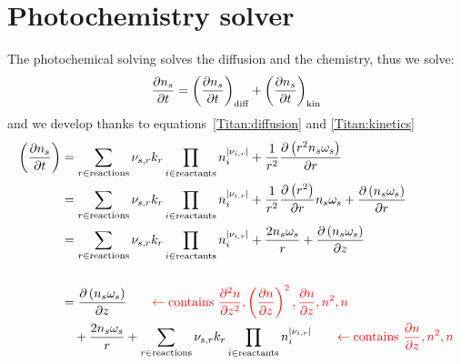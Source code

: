 \section{Photochemistry solver}

The photochemical solving solves the diffusion and the chemistry, thus we solve:
\begin{equation}
\frac{\partial n_s}{\partial t} = \left(\frac{\partial n_s}{\partial t}\right)_\text{diff} + \left(\frac{\partial n_s}{\partial t}\right)_\text{kin}
\end{equation}
and we develop thanks to equations~\ref{Titan:diffusion} and \ref{Titan:kinetics}
\begin{equation}
\begin{split}
\left(\frac{\partial n_s}{\partial t}\right) & = \sum_{r\in \text{reactions}} {\nu_{s,r}}k_{r} \prod_{i\in\text{reactants}}n_i^{|{\nu_{i,r}}|} +
                                     \frac{1}{r^2}\frac{\partial\left(r^2n_s\omega_s\right)}{\partial r} \\
                                 & = \sum_{r\in \text{reactions}} {\nu_{s,r}} k_r\prod_{i\in\text{reactants}}n_i^{|{\nu_{i,r}}|} +
                                     \frac{1}{r^2}\frac{\partial\left(r^2\right)}{\partial r}n_s\omega_s + \frac{\partial\left(n_s\omega_s\right)}{\partial r} \\
                                 & = \sum_{r\in \text{reactions}} {\nu_{s,r}} k_{r}\prod_{i\in\text{reactants}}n_i^{|{\nu_{i,r}}|} +
                                     \frac{2n_s\omega_s}{r} + \frac{\partial\left(n_s\omega_s\right)}{\partial z} \\[\baselineskip]
                                 & = \frac{\partial\left(n_s\omega_s\right)}{\partial z} 
                                        {\qquad\color{red}\leftarrow \text{contains } 
                                                \frac{\partial^2n}{\partial{z}^2}, \left(\frac{\partial n}{\partial z}\right)^2, \frac{\partial n}{\partial z}, n^2, n}\\
                                 &  \quad + \frac{2n_s\omega_s}{r}
                                          + \sum_{r\in \text{reactions}} {\nu_{s,r}} k_{r}\prod_{i\in\text{reactants}}n_i^{|{\nu_{i,r}}|} 
                                        {\qquad\color{red} \leftarrow \text{contains } \frac{\partial n}{\partial z}, n^2, n}\\
\end{split}
\end{equation}
